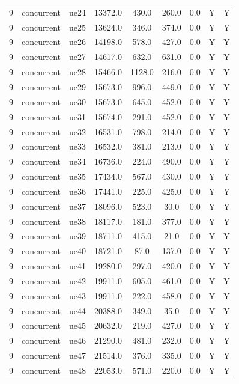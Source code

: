 \begin{table}[ht]
\begin{tabular}{|c|c|c|c|c|c|c|c|c|}
9 & concurrent & ue24 & 13372.0 & 430.0 & 260.0 & 0.0 & Y & Y \\
9 & concurrent & ue25 & 13624.0 & 346.0 & 374.0 & 0.0 & Y & Y \\
9 & concurrent & ue26 & 14198.0 & 578.0 & 427.0 & 0.0 & Y & Y \\
9 & concurrent & ue27 & 14617.0 & 632.0 & 631.0 & 0.0 & Y & Y \\
9 & concurrent & ue28 & 15466.0 & 1128.0 & 216.0 & 0.0 & Y & Y \\
9 & concurrent & ue29 & 15673.0 & 996.0 & 449.0 & 0.0 & Y & Y \\
9 & concurrent & ue30 & 15673.0 & 645.0 & 452.0 & 0.0 & Y & Y \\
9 & concurrent & ue31 & 15674.0 & 291.0 & 452.0 & 0.0 & Y & Y \\
9 & concurrent & ue32 & 16531.0 & 798.0 & 214.0 & 0.0 & Y & Y \\
9 & concurrent & ue33 & 16532.0 & 381.0 & 213.0 & 0.0 & Y & Y \\
9 & concurrent & ue34 & 16736.0 & 224.0 & 490.0 & 0.0 & Y & Y \\
9 & concurrent & ue35 & 17434.0 & 567.0 & 430.0 & 0.0 & Y & Y \\
9 & concurrent & ue36 & 17441.0 & 225.0 & 425.0 & 0.0 & Y & Y \\
9 & concurrent & ue37 & 18096.0 & 523.0 & 30.0 & 0.0 & Y & Y \\
9 & concurrent & ue38 & 18117.0 & 181.0 & 377.0 & 0.0 & Y & Y \\
9 & concurrent & ue39 & 18711.0 & 415.0 & 21.0 & 0.0 & Y & Y \\
9 & concurrent & ue40 & 18721.0 & 87.0 & 137.0 & 0.0 & Y & Y \\
9 & concurrent & ue41 & 19280.0 & 297.0 & 420.0 & 0.0 & Y & Y \\
9 & concurrent & ue42 & 19911.0 & 605.0 & 461.0 & 0.0 & Y & Y \\
9 & concurrent & ue43 & 19911.0 & 222.0 & 458.0 & 0.0 & Y & Y \\
9 & concurrent & ue44 & 20388.0 & 349.0 & 35.0 & 0.0 & Y & Y \\
9 & concurrent & ue45 & 20632.0 & 219.0 & 427.0 & 0.0 & Y & Y \\
9 & concurrent & ue46 & 21290.0 & 481.0 & 232.0 & 0.0 & Y & Y \\
9 & concurrent & ue47 & 21514.0 & 376.0 & 335.0 & 0.0 & Y & Y \\
9 & concurrent & ue48 & 22053.0 & 571.0 & 220.0 & 0.0 & Y & Y \\

\end{tabular}
\end{table}
